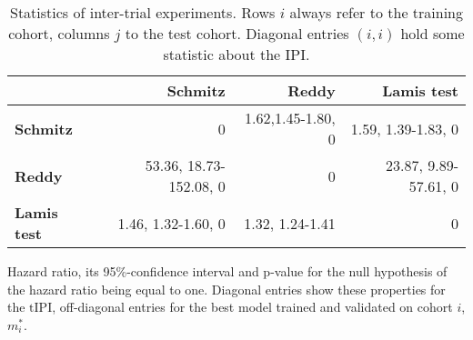 \begin{table}
    \vspace{0.5cm}
    \begin{subtable}{\textwidth}
        \centering
        \begin{tabular}{lrrr}
            \hline
            & \textbf{Schmitz} & \textbf{Reddy} & \textbf{Lamis test} \\
            \hline
            \textbf{Schmitz} & \num{0} & \num{1.62},\num{1.45}-\num{1.80}, \num{0} & 
                \num{1.59}, \num{1.39}-\num{1.83}, 0 \\
            \textbf{Reddy} & \num{53.36}, \num{18.73}-\num{152.08}, 0 & \num{0} & 
                \num{23.87}, \num{9.89}-\num{57.61}, 0 \\
            \textbf{Lamis test} & \num{1.46}, \num{1.32}-\num{1.60}, 0 & 
                \num{1.32}, \num{1.24}-\num{1.41} & \num{0} \\
            \hline
        \end{tabular}
        \caption{Hazard ratio, its \num{95}\%-confidence interval and p-value for the null 
            hypothesis of the hazard ratio being equal to one. Diagonal entries show these 
            properties for the $\text{tIPI}$, off-diagonal entries for the best model trained and 
            validated on cohort $i$, $m_i^*$.}
            \label{subtab:inter-hr}
    \end{subtable}
    \caption{Statistics of inter-trial experiments. Rows $i$ always refer to the training cohort, 
        columns $j$ to the test cohort. Diagonal entries $(i, i)$ hold some statistic about the 
        IPI.}
    \label{table:inter-trial}
\end{table}